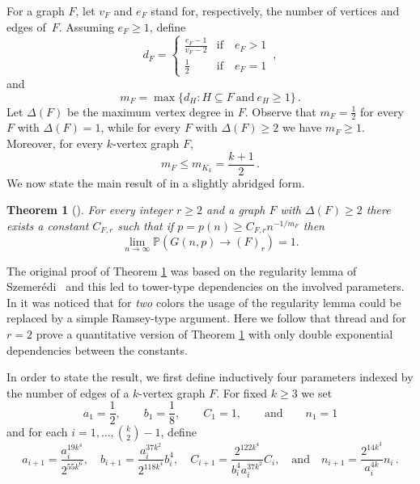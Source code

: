 \documentclass[reqno, 12pt]{amsart}
\newcommand{\PP}{\mathds{P}}
\newtheorem{theorem}{Theorem}
\def\PP{\mathds P}
\begin{document}
For a graph $F$,  let $v_F$ and $e_F$ stand for, respectively, the number of vertices and edges of~$F$. Assuming $e_F\ge1$, define
\begin{equation}\label{eq:dF}
d_{F}=
 \begin{cases}
   \frac{e_{F}-1}{v_{F}-2}&\text{if}\quad e_{F}>1\\
   \frac12&\text{if}\quad e_{F}=1
 \end{cases}\,,
\end{equation}
and
  \begin{equation}\label{eq:mF}
  m_{F}=\max\{d_{H}\colon H\subseteq F\ \text{and}\ e_{H}\geq
  1\}\,.
  \end{equation}
Let $\Delta(F)$ be the maximum vertex degree in $F$. Observe that $m_F=\tfrac12$ for every $F$ with $\Delta(F)=1$, while for every $F$ with
$\Delta(F)\ge2$ we have $m_F\ge1$. Moreover, for every $k$-vertex graph $F$,
\[
    m_F\leq m_{K_k}=\frac{k+1}{2}\,.
\]
We now state the main result of \cite{rr} in a slightly abridged form.

\begin{theorem}[\cite{rr}]
\label{95} For every integer $r\ge2$ and a graph $F$ with $\Delta(F)\ge2$ there exists a constant
$C_{F,r}$ such that if $p=p(n)\ge C_{F,r}n^{-1/m_F}$ then
$$\lim_{n\to\infty}\PP(G(n,p)\rightarrow (F)_r)=1.$$
\end{theorem}

\noindent The original proof of Theorem \ref{95} was based on the regularity lemma of
Szemer\'edi~\cite{Szem} and this led to  tower-type dependencies on the involved parameters. In
\cite{rrs} it was noticed that for \emph{two} colors the usage of the regularity lemma could be
replaced by a simple Ramsey-type argument. Here we follow that thread and for $r=2$ prove a
quantitative version of  Theorem \ref{95} with only double exponential dependencies between the
constants.

In order to state the result, we first define inductively four parameters indexed by the number of
edges of a $k$-vertex graph $F$. For fixed $k\geq 3$ we set
\begin{equation}\label{eq:L4-1}
    a_1=\frac12,\qquad b_1=\frac18, \qquad C_1=1,\qquad\text{and}\qquad n_1=1
\end{equation}
and for each $i=1,\dots,\binom{k}{2}-1$,  define
\begin{equation}\label{rec}
    a_{i+1}=\frac{a_i^{19k^4}}{2^{55k^6}},\quad
    b_{i+1}=\frac{a_i^{37k^2}}{2^{118k^4}}b_i^4,\quad
    C_{i+1}=\frac{2^{122k^4}}{b_i^{4}a_i^{37k^2}}C_i,\quad \text{and}\quad
    n_{i+1}=\frac{2^{14k^3}}{a_{i}^{4k}}n_{i}\,.
\end{equation}
\end{document}
